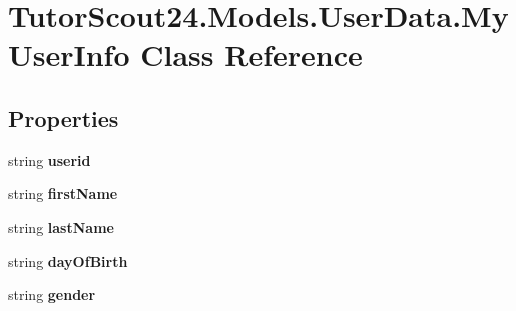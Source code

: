 \hypertarget{class_tutor_scout24_1_1_models_1_1_user_data_1_1_my_user_info}{}\section{Tutor\+Scout24.\+Models.\+User\+Data.\+My\+User\+Info Class Reference}
\label{class_tutor_scout24_1_1_models_1_1_user_data_1_1_my_user_info}
\subsection*{Properties}
\begin{DoxyCompactItemize}
\item 
\mbox{\label{class_tutor_scout24_1_1_models_1_1_user_data_1_1_my_user_info_af8452024d7dbc72c1311a3bfdf13e6c0}} 
string {\bfseries userid}
\item 
\mbox{\label{class_tutor_scout24_1_1_models_1_1_user_data_1_1_my_user_info_a0193d725bd649272e794e80b5aca368f}} 
string {\bfseries first\+Name}
\item 
\mbox{\label{class_tutor_scout24_1_1_models_1_1_user_data_1_1_my_user_info_a13d1c6720a3f821fe8b45e01c7ec65e6}} 
string {\bfseries last\+Name}
\item 
\mbox{\label{class_tutor_scout24_1_1_models_1_1_user_data_1_1_my_user_info_ae7b490adcb01a2100a21d7228f587e87}} 
string {\bfseries day\+Of\+Birth}
\item 
\mbox{\label{class_tutor_scout24_1_1_models_1_1_user_data_1_1_my_user_info_a77e906da3ff0f7e8bd0fa5cf57e96a13}} 
string {\bfseries gender}

\end{DoxyCompactItemize}
